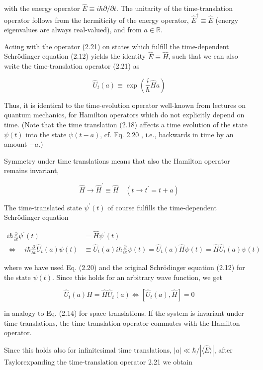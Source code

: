 \documentclass[10pt, letterpaper]{article}
\begin{document}
with the energy operator $\hat{E} \equiv i \hbar \partial / \partial t$. The unitarity of the time-translation operator follows from the hermiticity of the energy operator, $\hat{E}^{\dagger} \equiv \hat{E}$ (energy eigenvalues are always real-valued), and from $a \in \mathbb{R}$.

Acting with the operator (2.21) on states which fulfill the time-dependent Schrödinger equation (2.12) yields the identity $\hat{E} \equiv \hat{H}$, such that we can also write the time-translation operator (2.21) as

$$
\hat{U}_{t}(a) \equiv \exp \left(\frac{i}{\hbar} \hat{H} a\right)
$$

Thus, it is identical to the time-evolution operator well-known from lectures on quantum mechanics, for Hamilton operators which do not explicitly depend on time. (Note that the time translation (2.18) affects a time evolution of the state $\psi(t)$ into the state $\psi(t-a)$, cf. Eq. 2.20 , i.e., backwards in time by an amount $-a$.)

Symmetry under time translations means that also the Hamilton operator remains invariant,

$$
\hat{H} \longrightarrow \hat{H}^{\prime} \equiv \hat{H} \quad\left(t \longrightarrow t^{\prime}=t+a\right)
$$

The time-translated state $\psi^{\prime}(t)$ of course fulfills the time-dependent Schrödinger equation

$$
\begin{aligned}
i \hbar \frac{\partial}{\partial t} \psi^{\prime}(t) & =\hat{H} \psi^{\prime}(t) \\
\Longleftrightarrow \quad i \hbar \frac{\partial}{\partial t} \hat{U}_{t}(a) \psi(t) & \equiv \hat{U}_{t}(a) i \hbar \frac{\partial}{\partial t} \psi(t)=\hat{U}_{t}(a) \hat{H} \psi(t)=\hat{H} \hat{U}_{t}(a) \psi(t)
\end{aligned}
$$

where we have used Eq. (2.20) and the original Schrödinger equation (2.12) for the state $\psi(t)$. Since this holds for an arbitrary wave function, we get

$$
\hat{U}_{t}(a) \hat{H}=\hat{H} \hat{U}_{t}(a) \Longleftrightarrow\left[\hat{U}_{t}(a), \hat{H}\right]=0
$$

in analogy to Eq. (2.14) for space translations. If the system is invariant under time translations, the time-translation operator commutes with the Hamilton operator.

Since this holds also for infinitesimal time translations, $|a| \ll \hbar /|\langle\hat{E}\rangle|$, after Taylorexpanding the time-translation operator 2.21 we obtain
\end{document}
